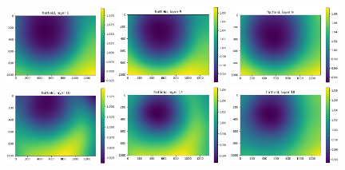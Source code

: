 \documentclass[letterpaper,11pt]{article}
\begin{document}
\begin{figure}[!ht]
\centering
\includegraphics[width=0.32\textwidth]{images/methods/flatfield_layers_vectra/flatfield_layer_1}
\includegraphics[width=0.32\textwidth]{images/methods/flatfield_layers_vectra/flatfield_layer_5}
\includegraphics[width=0.32\textwidth]{images/methods/flatfield_layers_vectra/flatfield_layer_9}
\includegraphics[width=0.32\textwidth]{images/methods/flatfield_layers_vectra/flatfield_layer_10}
\includegraphics[width=0.32\textwidth]{images/methods/flatfield_layers_vectra/flatfield_layer_14}
\includegraphics[width=0.32\textwidth]{images/methods/flatfield_layers_vectra/flatfield_layer_18}

\end{figure}
\end{document}
